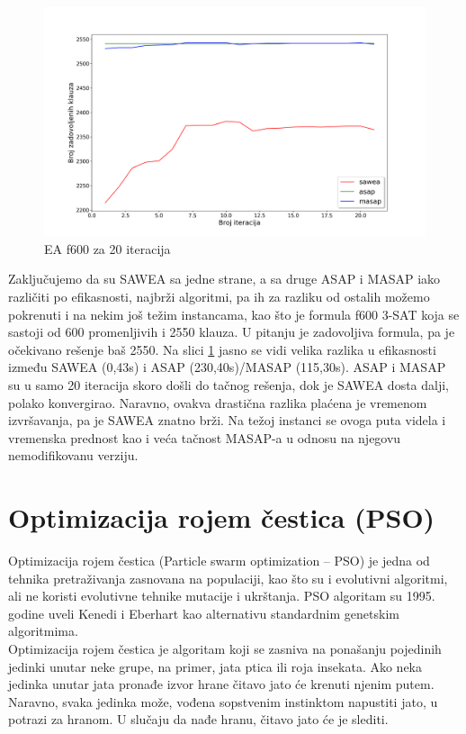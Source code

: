 \documentclass[a4paper]{article}
\begin{document}
\begin{figure}[h!]
\centering
\includegraphics[width=\textwidth]{f600-sawea-asap-masap.png}
\caption{EA f600 za 20 iteracija}\label{img:ea_f600}
\end{figure}

Zaključujemo da su SAWEA sa jedne strane, a sa druge ASAP i MASAP iako različiti 
po efikasnosti, najbrži algoritmi, 
pa ih za razliku od ostalih možemo pokrenuti i na nekim još težim instancama, kao što 
je formula f600 3-SAT koja se sastoji od 600 promenljivih i 2550 klauza. U pitanju je 
zadovoljiva formula, pa je očekivano rešenje baš 2550. Na slici \ref{img:ea_f600}
jasno se vidi velika razlika u efikasnosti između SAWEA (0,43s) i 
ASAP (230,40s)/MASAP (115,30s).
ASAP i MASAP su u samo 20 iteracija skoro došli do tačnog rešenja, dok je SAWEA dosta dalji,
polako konvergirao. Naravno, ovakva drastična razlika plaćena je vremenom izvršavanja,
pa je SAWEA znatno brži. Na težoj instanci se ovoga puta videla i vremenska prednost kao i
veća tačnost MASAP-a u odnosu na njegovu nemodifikovanu verziju.


\newpage


\section{Optimizacija rojem čestica (PSO)}
\label{sec:pso}
Optimizacija rojem čestica (Particle swarm optimization – PSO) \cite{PSO_Russell} 
je jedna od tehnika pretraživanja zasnovana na populaciji, kao što su i 
evolutivni algoritmi, ali ne koristi evolutivne tehnike mutacije i ukrštanja.
PSO algoritam su 1995. godine uveli Kenedi i Eberhart kao 
alternativu standardnim genetskim algoritmima. \\

Optimizacija rojem čestica je algoritam koji se zasniva na ponašanju pojedinih jedinki
unutar neke grupe, na primer, jata ptica ili roja insekata. Ako neka jedinka
unutar jata pronađe izvor hrane čitavo jato će krenuti njenim putem. Naravno, svaka 
jedinka može, vođena sopstvenim instinktom napustiti jato, u potrazi za hranom.
U slučaju da nađe hranu, čitavo jato će je slediti. \\
\end{document}
